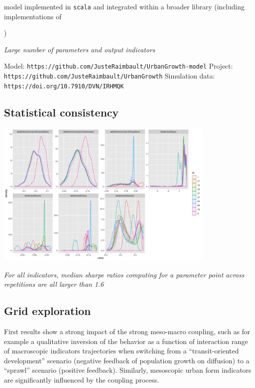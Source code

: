\documentclass[11pt]{article}
\begin{document}
 model implemented in \texttt{scala} and integrated within a broader library (including implementations of \cite{raimbault2018indirect} \cite{raimbault2018calibration}

\cite{favaro2011gibrat} \cite{cottineau2015modular})

\textit{Large number of parameters and output indicators}


Model: \texttt{https://github.com/JusteRaimbault/UrbanGrowth-model}
  Project: \texttt{https://github.com/JusteRaimbault/UrbanGrowth}
  Simulation data: \texttt{https://doi.org/10.7910/DVN/IRHMQK}




\subsection{Statistical consistency}



\medskip

\begin{center}
\includegraphics[width=0.8\textwidth]{figures/allindics_hist.png}
\end{center}

\textit{For all indicators, median sharpe ratios computing for a parameter point across repetitions are all larger than 1.6}

\subsection{Grid exploration}



First results show a strong impact of the strong meso-macro coupling, such as for example a qualitative inversion of the behavior as a function of interaction range of macroscopic indicators trajectories when switching from a ``transit-oriented development'' scenario (negative feedback of population growth on diffusion) to a ``sprawl'' scenario (positive feedback). Similarly, mesoscopic urban form indicators are significantly influenced by the coupling process.
\end{document}
